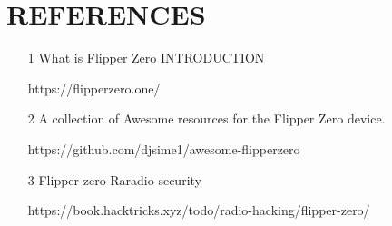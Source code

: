 \documentclass[a4paper,11pt]{report}
\begin{document}
\chapter{REFERENCES}
\begin{itemize}
\item [1] What is Flipper Zero INTRODUCTION  
                                                                     
https://flipperzero.one/
\item[2] A collection of Awesome resources for the Flipper Zero device.

https://github.com/djsime1/awesome-flipperzero
\item[3] Flipper zero Raradio-security

https://book.hacktricks.xyz/todo/radio-hacking/flipper-zero/
\vspace{12pt}
\end{itemize}
\end{document}
